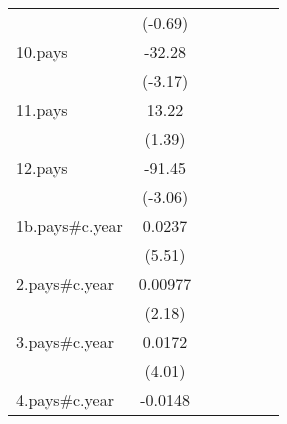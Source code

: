 {\begin{tabular}{l*{6}{c}}
                    &     (-0.69)         &                     &                     &                     &                     &                     \\
[1em]
10.pays             &      -32.28\sym{**} &                     &                     &                     &                     &                     \\
                    &     (-3.17)         &                     &                     &                     &                     &                     \\
[1em]
11.pays             &       13.22         &                     &                     &                     &                     &                     \\
                    &      (1.39)         &                     &                     &                     &                     &                     \\
[1em]
12.pays             &      -91.45\sym{**} &                     &                     &                     &                     &                     \\
                    &     (-3.06)         &                     &                     &                     &                     &                     \\
[1em]
1b.pays#c.year      &      0.0237\sym{***}&                     &                     &                     &                     &                     \\
                    &      (5.51)         &                     &                     &                     &                     &                     \\
[1em]
2.pays#c.year       &     0.00977\sym{*}  &                     &                     &                     &                     &                     \\
                    &      (2.18)         &                     &                     &                     &                     &                     \\
[1em]
3.pays#c.year       &      0.0172\sym{***}&                     &                     &                     &                     &                     \\
                    &      (4.01)         &                     &                     &                     &                     &                     \\
[1em]
4.pays#c.year       &     -0.0148\sym{***}&                     &                     &                     &                     &                     \\

\end{tabular}}
